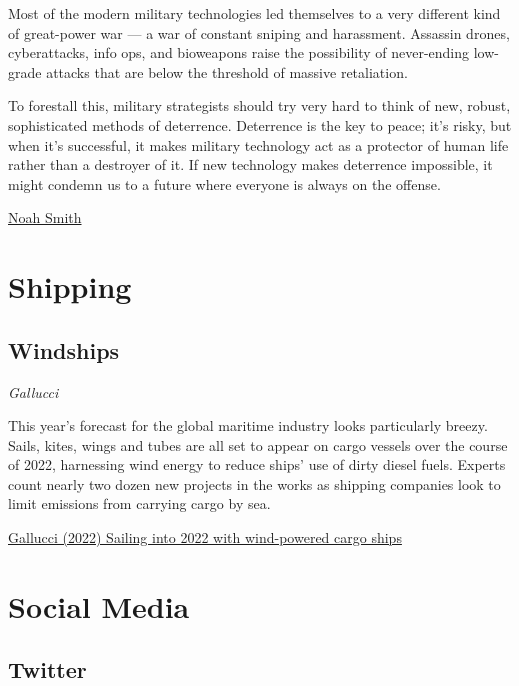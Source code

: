 \documentclass[
]{book}
\begin{document}
Most of the modern military technologies led themselves to a very different kind of great-power war --- a war of constant sniping and harassment. Assassin drones, cyberattacks, info ops, and bioweapons raise the possibility of never-ending low-grade attacks that are below the threshold of massive retaliation.

To forestall this, military strategists should try very hard to think of new, robust, sophisticated methods of deterrence. Deterrence is the key to peace; it's risky, but when it's successful, it makes military technology act as a protector of human life rather than a destroyer of it. If new technology makes deterrence impossible, it might condemn us to a future where everyone is always on the offense.

\href{https://noahpinion.substack.com/p/the-future-of-war-is-bizarre-and}{Noah Smith}

\hypertarget{shipping}{%
\chapter{Shipping}\label{shipping}}

\hypertarget{windships}{%
\section{Windships}\label{windships}}

\emph{Gallucci}

This year's forecast for the global maritime industry looks particularly breezy. Sails, kites, wings and tubes are all set to appear on cargo vessels over the course of 2022, harnessing wind energy to reduce ships' use of dirty diesel fuels. Experts count nearly two dozen new projects in the works as shipping companies look to limit emissions from carrying cargo by sea.

\href{https://www.canarymedia.com/articles/sea-transport/sailing-into-2022-with-wind-powered-cargo-ships}{Gallucci (2022) Sailing into 2022 with wind-powered cargo ships}

\hypertarget{social-media}{%
\chapter{Social Media}\label{social-media}}

\hypertarget{twitter}{%
\section{Twitter}\label{twitter}}
\end{document}
